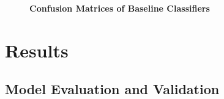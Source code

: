 \begin{figure}[!hbtp]

    \caption{\textbf{Confusion Matrices of Baseline Classifiers}}
\end{figure}



\chapter*{Results}


\section*{Model Evaluation and Validation}


